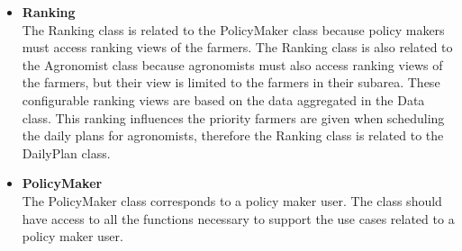 \begin{itemize}
\item \textbf{Ranking}\\
The Ranking class is related to the PolicyMaker class because policy makers must access ranking views of the farmers. The Ranking class is also related to the Agronomist class because agronomists must also access ranking views of the farmers, but their view is limited to the farmers in their subarea. These configurable ranking views are based on the data aggregated in the Data class. This ranking influences the priority farmers are given when scheduling the daily plans for agronomists, therefore the Ranking class is related to the DailyPlan class.

\item \textbf{PolicyMaker}\\
The PolicyMaker class corresponds to a policy maker user. The class should have access to all the functions necessary to support the use cases related to a policy maker user. 
\end{itemize}

